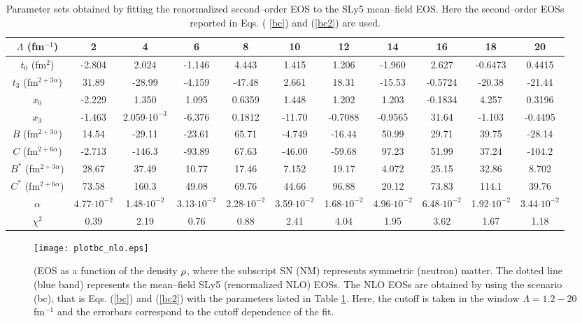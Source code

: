 \documentclass[aps,11pt,prc,preprint,superscriptaddress,nofootinbib]{revtex4}
\begin{document}
\begin{table}[htbp]
\begin{tabular}{|c|c|c|c|c|c|c|c|c|c|c|}
\hline
$\Lambda $ (fm$^{-1}$) & 2 & 4 & 6 & 8 & 10 & 12 & 14 & 16 & 18 & 20 \\ \hline
$t_{0}$ (fm$^{2}$) & -2.804 & 2.024 & -1.146 & 4.443 & 1.415 & 1.206 & -1.960 & 2.627 & -0.6473 & 0.4415\\ \hline
$t_{3}$ (fm$^{2+3\alpha }$) & 31.89 & -28.99 & -4.159 & -47.48 & 2.661 & 18.31 & -15.53 & -0.5724 & -20.38 & -21.44
\\ \hline
$x_{0}$ & -2.229 & 1.350 & 1.095 & 0.6359 & 1.448 & 1.202 & 1.203 & -0.1834 & 4.257 & 0.3196\\ \hline
$x_{3}$ & -1.463 & 2.059$\cdot 10^{-3}$ & -6.376 & 0.1812 & -11.70 & -0.7088 & -0.9565 & 31.64 & -1.103 & -0.4495\\ 
\hline
$B$ (fm$^{2+3\alpha }$) & 14.54 & -29.11 & -23.61 & 65.71 & -4.749 & -16.44 & 50.99 & 29.71 & 39.75 & -28.14\\ 
\hline
$C$ (fm$^{2+6\alpha }$) & -2.713 & -146.3 & -93.89 & 67.63 & -46.00 & -59.68 & 97.23 & 51.99 & 37.24 & -104.2\\ 
\hline
$B^{\ast }$ (fm$^{2+3\alpha }$) & 28.67 & 37.49 & 10.77 & 17.46 & 7.152 & 19.17 & 4.072 & 25.15 & 32.86 & 8.702
\\ \hline
$C^{\ast }$ (fm$^{2+6\alpha }$) & 73.58 & 160.3 & 49.08 & 69.76 & 44.66 & 96.88 & 20.12 & 73.83 & 114.1 & 39.76
\\ \hline
$\alpha $ & 4.77$\cdot 10^{-2}$ & 1.48$\cdot 10^{-2}$ & 3.13$\cdot 10^{-2}$
& 2.28$\cdot 10^{-2}$ & 3.59$\cdot 10^{-2}$ & 1.68$\cdot 10^{-2}$ & 4.96$\cdot 10^{-2}$ & 6.48$\cdot 10^{-2}$ & 1.92$\cdot 10^{-2}$ & 3.44$\cdot 10^{-2}$  \\ \hline
$\chi ^{2}$ & 0.39 & 2.19 & 0.76 & 0.88 & 2.41 & 4.04 & 1.95 & 3.62 & 1.67 & 1.18 \\ \hline
\end{tabular}%
\caption{Parameter sets obtained by fitting the renormalized second--order
EOS to the SLy5 mean--field EOS. Here the second--order EOSs reported in Eqs. (%
\protect\ref{bc}) and (\protect\ref{bc2}) are used.}
\label{tnlob}
\end{table}

\begin{figure}[tbp]
\texttt{[image: plotbc\_nlo.eps]}
\caption{(EOS as a function of the density $\protect\rho $,
where the subscript SN (NM) represents symmetric (neutron) matter. The
dotted line (blue band) represents the mean--field SLy5 (renormalized
NLO) EOSs. The NLO EOSs are obtained
by using the scenario (bc), that is Eqs. (\protect\ref{bc}) and (\protect\ref{bc2}) with the parameters listed in
Table \protect\ref{tnlob}. Here, the cutoff is taken in the window $\Lambda =1.2-20$ fm$^{-1}$ and the errorbars correspond to the 
cutoff dependence of the fit.}
\label{plotnlob}
\end{figure}
\end{document}
